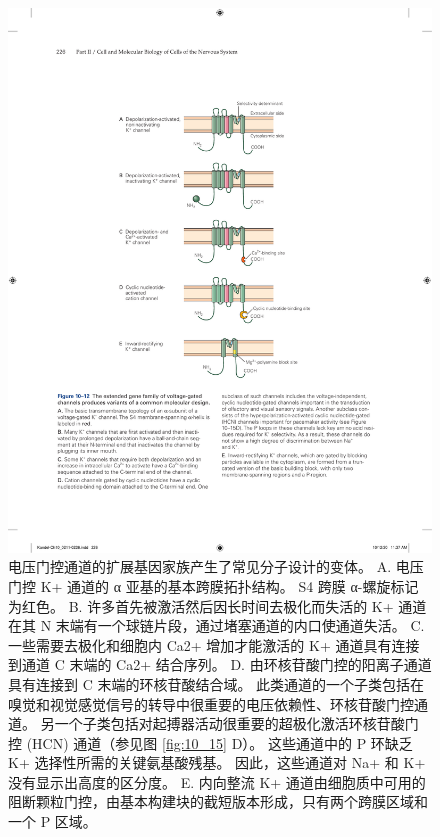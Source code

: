 \begin{figure}[htbp]
	\centering
	\includegraphics[width=0.6\linewidth]{chap10/fig_10_12}
	\caption{电压门控通道的扩展基因家族产生了常见分子设计的变体。 A. 电压门控 K+ 通道的 α 亚基的基本跨膜拓扑结构。 S4 跨膜 α-螺旋标记为红色。 B. 许多首先被激活然后因长时间去极化而失活的 K+ 通道在其 N 末端有一个球链片段，通过堵塞通道的内口使通道失活。 C. 一些需要去极化和细胞内 Ca2+ 增加才能激活的 K+ 通道具有连接到通道 C 末端的 Ca2+ 结合序列。 D. 由环核苷酸门控的阳离子通道具有连接到 C 末端的环核苷酸结合域。 此类通道的一个子类包括在嗅觉和视觉感觉信号的转导中很重要的电压依赖性、环核苷酸门控通道。 另一个子类包括对起搏器活动很重要的超极化激活环核苷酸门控 (HCN) 通道（参见图 \ref{fig:10_15} D）。 这些通道中的 P 环缺乏 K+ 选择性所需的关键氨基酸残基。 因此，这些通道对 Na+ 和 K+ 没有显示出高度的区分度。 E. 内向整流 K+ 通道由细胞质中可用的阻断颗粒门控，由基本构建块的截短版本形成，只有两个跨膜区域和一个 P 区域。}
	\label{fig:10_12}
\end{figure}


